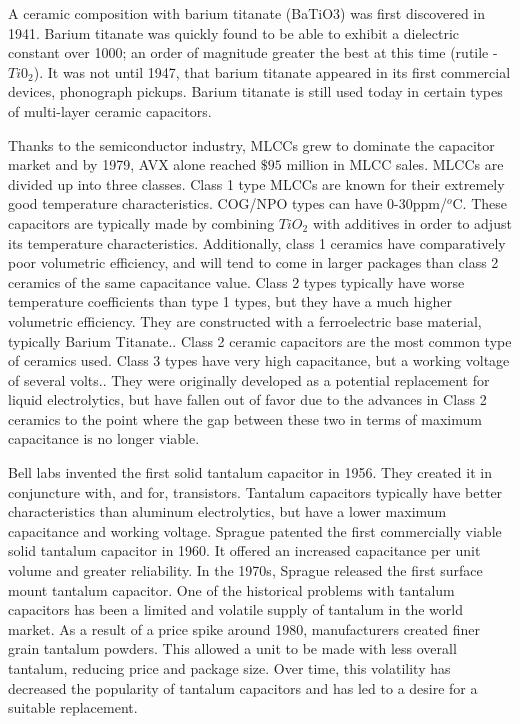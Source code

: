 A ceramic composition with barium titanate (BaTiO3) was first discovered in 1941. Barium titanate was quickly found to be able to exhibit a dielectric constant over 1000; an order of magnitude greater the best at this time (rutile - $Ti0_2$). It was not until 1947, that barium titanate appeared in its first commercial devices, phonograph pickups.\cite{piezCer}\cite{hist_cerFilt}\cite[Ch 3 Sec III]{cerMaterials} Barium titanate is still used today in certain types of multi-layer ceramic capacitors.

Thanks to the semiconductor industry, MLCCs grew to dominate the capacitor market and by 1979, AVX alone reached $\$95$ million in MLCC sales.\cite{avx_hist}
MLCCs are divided up into three classes. Class 1 type MLCCs are known for their extremely good temperature characteristics. COG/NPO types can have 0-30ppm/$^o$C. These capacitors are typically made by combining $TiO_2$ with additives in order to adjust its temperature characteristics.\cite{intro_cerCaps} Additionally, class 1 ceramics have comparatively poor volumetric efficiency, and will tend to come in larger packages than class 2 ceramics of the same capacitance value. Class 2 types typically have worse temperature coefficients than type 1 types, but they have a much higher volumetric efficiency. They are constructed with a ferroelectric base material, typically Barium Titanate.\cite{intro_cerCaps}. Class 2 ceramic capacitors are the most common type of ceramics used. Class 3 types have very high capacitance, but a working voltage of several volts.\cite{hist_cerFilt}\cite[Ch 3 Sec VI]{cerMaterials}\cite{atCer_tempco}. They were originally developed as a potential replacement for liquid electrolytics, but have fallen out of favor due to the advances in Class 2 ceramics to the point where the gap between these two in terms of maximum capacitance is no longer viable\cite{wiki_cer}.

Bell labs invented the first solid tantalum capacitor in 1956. They created it in conjuncture with, and for, transistors.\cite[f.~56-64]{dumInv} Tantalum capacitors typically have better characteristics than aluminum electrolytics, but have a lower maximum capacitance and working voltage.\cite{learn_caps}
Sprague patented the first commercially viable solid tantalum capacitor in 1960. It offered an increased capacitance per unit volume and greater reliability.\cite{charTant} In the 1970s, Sprague released the first surface mount tantalum capacitor.\cite{spragueHist}
One of the historical problems with tantalum capacitors has been a limited and volatile supply of tantalum in the world market. 
As a result of a price spike around 1980, manufacturers created finer grain tantalum powders. This allowed a unit to be made with less overall tantalum, reducing price and package size.\cite[ch~3.1]{tantMis}
Over time, this volatility has decreased the popularity of tantalum capacitors and has led to a desire for a suitable replacement.

